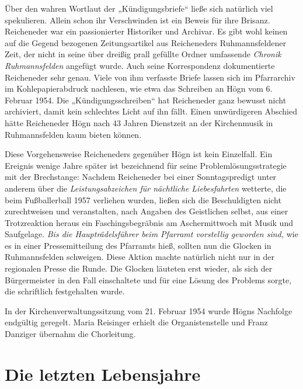 \documentclass{book}
\newcommand{\zitat}[1]{\textit{#1}}
\begin{document}
Über den wahren Wortlaut der „Kündigungsbriefe“ ließe sich natürlich
viel spekulieren. Allein schon ihr Verschwinden ist ein Beweis für ihre
Brisanz. Reicheneder war ein passionierter Historiker und Archivar. Es
gibt wohl keinen auf die Gegend bezogenen Zeitungsartikel aus
Reicheneders Ruhmannsfeldener Zeit, der nicht in seine über dreißig
prall gefüllte Ordner umfassende \textit{Chronik Ruhmannsfelden}
angefügt wurde. Auch seine Korrespondenz dokumentierte Reicheneder sehr
genau. Viele von ihm verfasste Briefe lassen sich im Pfarrarchiv im
Kohlepapierabdruck nachlesen, wie etwa das Schreiben an Högn vom 6.
Februar 1954. Die „Kündigungsschreiben“ hat Reicheneder ganz bewusst
nicht archiviert, damit kein schlechtes Licht auf ihn fällt. Einen
unwürdigeren Abschied hätte Reicheneder Högn nach 43 Jahren Dienstzeit
an der Kirchenmusik in Ruhmannsfelden kaum bieten können.

Diese Vorgehensweise Reicheneders gegenüber Högn ist kein Einzelfall.
Ein Ereignis wenige Jahre später ist bezeichnend für seine
Problemlösungsstrategie mit der Brechstange: Nachdem Reicheneder bei
einer Sonntagspredigt unter anderem über die
\zitat{Leistungsabzeichen für nächtliche Liebesfahrten}
wetterte, die beim Fußballerball 1957 verliehen wurden, ließen sich die
Beschuldigten nicht zurechtweisen und veranstalten, nach Angaben des
Geistlichen selbst, aus einer Trotzreaktion heraus ein
Faschingsbegräbnis am Aschermittwoch mit Musik und Saufgelage.
\zitat{Bis die Haupträdelsführer beim Pfarramt vorstellig
geworden sind,} wie es in einer Pressemitteilung des Pfarramts hieß,
sollten nun die Glocken in Ruhmannsfelden schweigen. Diese Aktion
machte natürlich nicht nur in der regionalen Presse die Runde. Die
Glocken läuteten erst wieder, als sich der Bürgermeister in den Fall
einschaltete und für eine Lösung des Problems sorgte, die schriftlich
festgehalten wurde.

In der Kirchenverwaltungssitzung vom 21. Februar 1954 wurde Högns
Nachfolge endgültig geregelt. Maria Reisinger erhielt die
Organistenstelle und Franz Danziger übernahm die Chorleitung.

\section{Die letzten Lebensjahre}
\end{document}
